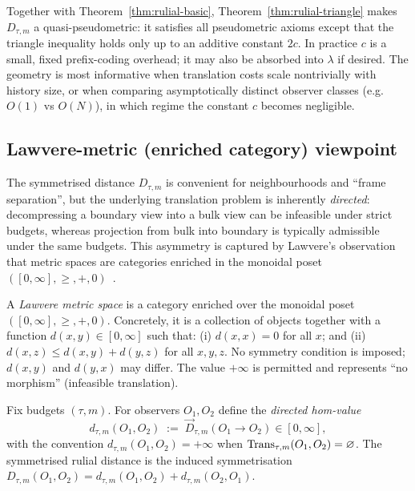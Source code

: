 \documentclass{aion}
\begin{document}
\begin{remark}
Together with Theorem~\ref{thm:rulial-basic}, Theorem~\ref{thm:rulial-triangle} makes $D_{\tau,m}$ a
quasi-pseudometric: it satisfies all pseudometric axioms except that the triangle inequality holds only up to an additive constant $2c$.
In practice $c$ is a small, fixed prefix-coding overhead; it may also be absorbed into $\lambda$ if desired.
The geometry is most informative when translation costs scale nontrivially with history size, or when comparing asymptotically distinct observer classes (e.g.\ $O(1)$ vs $O(N)$), in which regime the constant $c$ becomes negligible.
\end{remark}

\subsection{Lawvere-metric (enriched category) viewpoint}
\label{subsec:lawvere}

The symmetrised distance $D_{\tau,m}$ is convenient for neighbourhoods and ``frame separation'',
but the underlying translation problem is inherently \emph{directed}:
decompressing a boundary view into a bulk view can be infeasible under strict budgets,
whereas projection from bulk into boundary is typically admissible under the same budgets.
This asymmetry is captured by Lawvere's observation that metric spaces are categories enriched in
the monoidal poset $([0,\infty],\ge,+,0)$~\cite{Lawvere73,Kelly82}.

\begin{definition}\label{def:lawvere-metric}
A \emph{Lawvere metric space} is a category enriched over the monoidal poset $([0,\infty],\ge,+,0)$.
Concretely, it is a collection of objects together with a function $d(x,y)\in[0,\infty]$ such that:
(i) $d(x,x)=0$ for all $x$; and (ii) $d(x,z)\le d(x,y)+d(y,z)$ for all $x,y,z$.
No symmetry condition is imposed; $d(x,y)$ and $d(y,x)$ may differ.
The value $+\infty$ is permitted and represents ``no morphism'' (infeasible translation).
\end{definition}

\begin{definition}\label{def:lawvere-hom}
Fix budgets $(\tau,m)$.
For observers $O_1,O_2$ define the \emph{directed hom-value}
\[
  d_{\tau,m}(O_1,O_2) \;:=\; \vec{D}_{\tau,m}(O_1\!\to\!O_2)\in[0,\infty],
\]
with the convention $d_{\tau,m}(O_1,O_2)=+\infty$ when $\operatorname{Trans}_{\tau,m}(O_1,O_2)=\varnothing$.
The symmetrised rulial distance is the induced symmetrisation
$D_{\tau,m}(O_1,O_2)=d_{\tau,m}(O_1,O_2)+d_{\tau,m}(O_2,O_1)$.
\end{definition}
\end{document}
